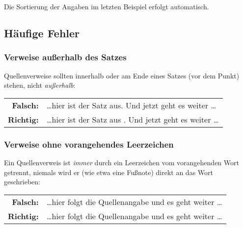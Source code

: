 Die Sortierung der Angaben im letzten Beispiel erfolgt automatisch.



\subsection{Häufige Fehler}

\subsubsection{Verweise außerhalb des Satzes}
Quellenverweise sollten innerhalb oder am Ende eines Satzes (\dah vor
dem Punkt) stehen, nicht \emph{außerhalb}:
%
\begin{center}
\begin{tabular}{rl}
 \textbf{Falsch:}  & \ldots hier ist der Satz aus. \cite{Oetiker2015} Und jetzt geht es weiter \ldots \\
 \textbf{Richtig:} & \ldots hier ist der Satz aus \cite{Oetiker2015}. Und jetzt geht es weiter \ldots
\end{tabular}
\end{center}

\subsubsection{Verweise ohne vorangehendes Leerzeichen}

Ein Quellenverweis ist \emph{immer} durch ein Leerzeichen vom vorangehenden Wort getrennt, niemals wird er (wie etwa eine Fußnote) direkt an das Wort geschrieben:

\begin{center}
\begin{tabular}{rl}
\textbf{Falsch:}  & \ldots hier folgt die Quellenangabe\cite{Oetiker2015} und es geht weiter \ldots \\
\textbf{Richtig:} & \ldots hier folgt die Quellenangabe \cite{Oetiker2015} und es geht weiter \ldots
\end{tabular}
\end{center}

